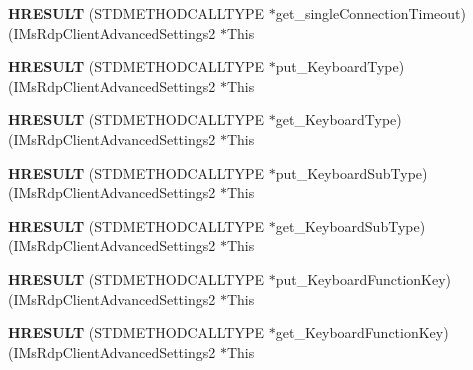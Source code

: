 \begin{DoxyCompactItemize}
{\bfseries H\+R\+E\+S\+U\+LT} (S\+T\+D\+M\+E\+T\+H\+O\+D\+C\+A\+L\+L\+T\+Y\+PE $\ast$get\+\_\+single\+Connection\+Timeout)(I\+Ms\+Rdp\+Client\+Advanced\+Settings2 $\ast$This
\item 
\mbox{\label{struct_i_ms_rdp_client_advanced_settings2_vtbl_ad4c42e444abd02bdb761544d3322f7eb}} 
{\bfseries H\+R\+E\+S\+U\+LT} (S\+T\+D\+M\+E\+T\+H\+O\+D\+C\+A\+L\+L\+T\+Y\+PE $\ast$put\+\_\+\+Keyboard\+Type)(I\+Ms\+Rdp\+Client\+Advanced\+Settings2 $\ast$This
\item 
\mbox{\label{struct_i_ms_rdp_client_advanced_settings2_vtbl_a0be5d3db3fbb346392391b47c43430ca}} 
{\bfseries H\+R\+E\+S\+U\+LT} (S\+T\+D\+M\+E\+T\+H\+O\+D\+C\+A\+L\+L\+T\+Y\+PE $\ast$get\+\_\+\+Keyboard\+Type)(I\+Ms\+Rdp\+Client\+Advanced\+Settings2 $\ast$This
\item 
\mbox{\label{struct_i_ms_rdp_client_advanced_settings2_vtbl_ac35a2776ddf7686c3ffdac63ed85fa91}} 
{\bfseries H\+R\+E\+S\+U\+LT} (S\+T\+D\+M\+E\+T\+H\+O\+D\+C\+A\+L\+L\+T\+Y\+PE $\ast$put\+\_\+\+Keyboard\+Sub\+Type)(I\+Ms\+Rdp\+Client\+Advanced\+Settings2 $\ast$This
\item 
\mbox{\label{struct_i_ms_rdp_client_advanced_settings2_vtbl_a63e886cfa7181cac91285734b154af1f}} 
{\bfseries H\+R\+E\+S\+U\+LT} (S\+T\+D\+M\+E\+T\+H\+O\+D\+C\+A\+L\+L\+T\+Y\+PE $\ast$get\+\_\+\+Keyboard\+Sub\+Type)(I\+Ms\+Rdp\+Client\+Advanced\+Settings2 $\ast$This
\item 
\mbox{\label{struct_i_ms_rdp_client_advanced_settings2_vtbl_a11c29737c6cccc4294bcdeca0dc1dc0b}} 
{\bfseries H\+R\+E\+S\+U\+LT} (S\+T\+D\+M\+E\+T\+H\+O\+D\+C\+A\+L\+L\+T\+Y\+PE $\ast$put\+\_\+\+Keyboard\+Function\+Key)(I\+Ms\+Rdp\+Client\+Advanced\+Settings2 $\ast$This
\item 
\mbox{\label{struct_i_ms_rdp_client_advanced_settings2_vtbl_aa5f414e0bee099271d13b8b711872a7d}} 
{\bfseries H\+R\+E\+S\+U\+LT} (S\+T\+D\+M\+E\+T\+H\+O\+D\+C\+A\+L\+L\+T\+Y\+PE $\ast$get\+\_\+\+Keyboard\+Function\+Key)(I\+Ms\+Rdp\+Client\+Advanced\+Settings2 $\ast$This

\end{DoxyCompactItemize}
